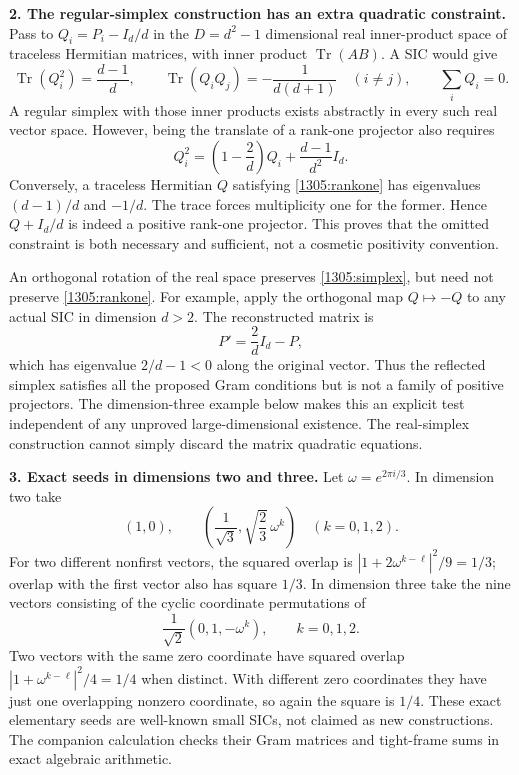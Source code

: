 \documentclass[11pt,a4paper]{article}
\numberwithin{equation}{section}
\begin{document}
\textbf{2. The regular-simplex construction has an extra quadratic constraint.}
Pass to $Q_i=P_i-I_d/d$ in the $D=d^2-1$ dimensional real inner-product
space of traceless Hermitian matrices, with inner product
$\operatorname{Tr}(AB)$. A SIC would give
\begin{equation}\label{1305:simplex}
 \operatorname{Tr}(Q_i^2)=\frac{d-1}{d},\qquad
 \operatorname{Tr}(Q_iQ_j)=-\frac1{d(d+1)}\quad(i\ne j),\qquad
 \sum_iQ_i=0.
\end{equation}
A regular simplex with those inner products exists abstractly in every
such real vector space. However, being the translate of a rank-one
projector also requires
\begin{equation}\label{1305:rankone}
 Q_i^2=\left(1-\frac2d\right)Q_i+\frac{d-1}{d^2}I_d.
\end{equation}
Conversely, a traceless Hermitian $Q$ satisfying
\eqref{1305:rankone} has eigenvalues $(d-1)/d$ and $-1/d$.
The trace forces multiplicity one for the former. Hence $Q+I_d/d$ is
indeed a positive rank-one projector. This proves that the omitted
constraint is both necessary and sufficient, not a cosmetic positivity
convention.

An orthogonal rotation of the real space preserves
\eqref{1305:simplex}, but need not preserve \eqref{1305:rankone}.
For example, apply the orthogonal map $Q\mapsto-Q$ to any actual SIC
in dimension $d>2$. The reconstructed matrix is
\[
 P'=\frac{2}{d}I_d-P,
\]
which has eigenvalue $2/d-1<0$ along the original vector. Thus the
reflected simplex satisfies all the proposed Gram conditions but is
not a family of positive projectors. The dimension-three example below
makes this an explicit test independent of any unproved large-dimensional
existence. The real-simplex construction cannot simply discard the
matrix quadratic equations.

\textbf{3. Exact seeds in dimensions two and three.}
Let $\omega=e^{2\pi i/3}$. In dimension two take
\[
 (1,0),\qquad
 \left(\frac1{\sqrt3},\sqrt{\frac23}\,\omega^k\right)
       \quad(k=0,1,2).
\]
For two different nonfirst vectors, the squared overlap is
$|1+2\omega^{k-\ell}|^2/9=1/3$; overlap with the first vector also
has square $1/3$. In dimension three take the nine vectors consisting
of the cyclic coordinate permutations of
\[
 \frac1{\sqrt2}(0,1,-\omega^k),\qquad k=0,1,2.
\]
Two vectors with the same zero coordinate have squared overlap
$|1+\omega^{k-\ell}|^2/4=1/4$ when distinct. With different zero
coordinates they have just one overlapping nonzero coordinate, so
again the square is $1/4$. These exact elementary seeds are well-known
small SICs, not claimed as new constructions. The companion calculation
checks their Gram matrices and tight-frame sums in exact algebraic
arithmetic.
\end{document}
